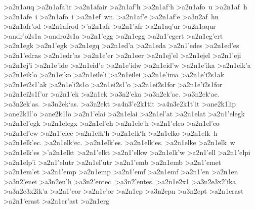 {>a2n1auq
>a2n1afa'ir 		%
>a2n1afair
>a2n1af'h		%
>a2n1af`h
>a2n1afo~u
>a2n1af~h
>a2n1afe~i
>a2n1afo~i
>a2n1ef~wn.
>a2n1af'e
>a2n1af`e
	>a3n2af~hn		%
>a2n1afr'od 		%
>a2n1afrod
>'a2n1afr    		%
>a2n1'afr
>a2n1aq'ur 		%
>a2n1aqur
>andr'o2s1a 		%
>andro2s1a
>a2n1'egg 		%
>a2n1egg
>a2n1'egert 		%
>a2n1eg'ert
>a2n1egk 		%
>a2n1'egk 		%
>a2n1egq  		%
>a2n1ed'a 		%
>a2n1eda
>a2n1'edes 		%
>a2n1ed'es
>a2n1'edras 		%
>a2n1edr'as
>a2n1e'er 		%
>a2n1eer
>a2n1ej'el  		%
>a2n1ejel
>a2n1'eji 		%
>a2n1ej'i
>a2n1e'ide 		%
>a2n1eid'e
>a2n1e'idw 		%
>a2n1eid'w
>a2n1e'ika 		%
>a2n1eik'a
>a2n1eik'o 		%
>a2n1eiko
>a2n1eile'i 		%
>a2n1eilei
>a2n1e'ima 		%
>a2n1e'i2s1ak  		%
>a2n1ei2s1'ak
>a2n1e'i2s1o  		%
>a2n1ei2s1'o
>a2n1ei2s1for 		%
>a2n1e'i2s1for 		%
>a2n1ei2s1f'or
>a2n1'ek   		%
>a2n1ek
	>a3n2'eka 		%
	>a3n2ek'ac. 		%
	>a3n2ek`ac.
	>a3n2ek'as.
	>a3n2ek`as.
	>a3n2ekt 		%
		>a4n3'e2k1tit		%
		>a4n3e2k1t'it
>ane2k1lip 		%
>ane2k1l'o		%
>ane2k1lo
>a2n1'elai   		%
>a2n1elai
>a2n1el'at		%
>a2n1elat
>a2n1'elegk		%
>a2n1el'egk
>a2n1elegx		%
>a2n1el'eh   		%
>a2n1ele'h
>a2n1'eleo		%
>a2n1el'eo
>a2n1el'ew
>a2n1'elee
>a2n1elk'h 		%
>a2n1elk`h
>a2n1elko
>a2n1elk~h
>a2n1elk'ec.
>a2n1elk`ec.
>a2n1elk'es.
>a2n1elk`es.
>a2n1elke
>a2n1elk~w
>a2n1elk'es
>'a2n1elkt   		%
>a2n1'elkt
>a2n1'elkw		%
>a2n1elk'w
>a2n1'ell    		%
>a2n1'elpi		%
>a2n1elp'i
>a2n1'elutr %
>a2n1el'utr
>a2n1'emb  		%
>a2n1emb
>a2n1'emet 		%
>a2n1em'et
>a2n1'emp  		%
>a2n1emp
>a2n1'emf  		%
>a2n1emf
>a2n1'en   		%
>a2n1en
	>a3n2'enei  		%
	>a3n2en'h   		%
	>a3n2'entec. 		%
	>a3n2'entes.
>a2n1e2x1  		%
	>a3n2e3x2'ika 		%
	>a3n2e3x2ik'a
>a2n1'eor		%
>a2n1e'or
>a2n1ep    		%
	>a3n2epn  	%
	>a3n2ept  	%
>a2n1erast  		%
>a2n1'erast 		%
>a2n1er'ast
>a2n1erg    		%
}
